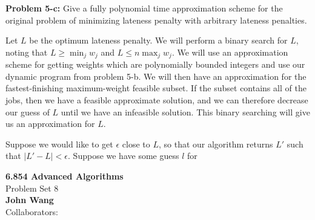 \documentclass[psamsfonts]{amsart}
\newenvironment{sol}{\vspace{0.25cm}{\large \bfseries Solution:}}{\qedsymbol}
\newenvironment{prob}[1]{\begin{framed}{\large \bfseries Problem #1:}}{\end{framed}}
\newcommand{\makenewtitle}{
    \begin{center}
    {\huge \bfseries 6.854 Advanced Algorithms} \\
    Problem Set 8\\
    \vspace{0.25cm}
    {\bfseries John Wang} \\
    Collaborators:  
    \end{center}
    \vspace{0.5cm}
}
\begin{document}
\begin{prob}{5-c}
Give a fully polynomial time approximation scheme for the original problem of minimizing lateness penalty with arbitrary lateness penalties.
\end{prob}
\begin{sol}
Let $L$ be the optimum lateness penalty. We will perform a binary search for $L$, noting that $L \geq \min_j w_j$ and $L \leq n \max_j w_j$. We will use an approximation scheme for getting weights which are polynomially bounded integers and use our dynamic program from problem 5-b. We will then have an approximation for the fastest-finishing maximum-weight feasible subset. If the subset contains all of the jobs, then we have a feasible approximate solution, and we can therefore decrease our guess of $L$ until we have an infeasible solution. This binary searching will give us an approximation for $L$. 

Suppose we would like to get $\epsilon$ close to $L$, so that our algorithm returns $L'$ such that $|L' - L| < \epsilon$. Suppose we have some guess $l$ for 
\end{sol}

\newpage
\makenewtitle
 
\end{document}

